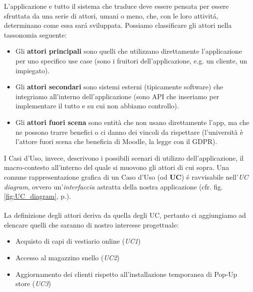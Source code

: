 \documentclass[12pt]{article}
\begin{document}
L'applicazione e tutto il sistema che traduce deve essere pensata per essere sfruttata da una serie di attori, umani o meno, che, con le loro attivit\'a, determinano come essa sar\'a sviluppata. Possiamo classificare gli attori nella tassonomia seguente:
\begin{itemize}
    \item Gli \textbf{attori principali} sono quelli che utilizzano direttamente l’applicazione per uno specifico use case (sono i fruitori dell’applicazione, e.g. un cliente, un impiegato).
    \item Gli \textbf{attori secondari} sono sistemi esterni (tipicamente software) che integriamo all’interno dell’applicazione (sono API che inseriamo per implementare il tutto e su cui non abbiamo controllo).
    \item Gli \textbf{attori fuori scena} sono entità che non usano direttamente l’app, ma che ne possono trarre benefici o ci danno dei vincoli da rispettare (l’università è l’attore fuori scena che beneficia di Moodle, la legge con il GDPR).
\end{itemize}

I Casi d'Uso, invece, descrivono i possibili scenari di utilizzo dell'applicazione, il macro-contesto all'interno del quale si muovono gli attori di cui sopra. Una comune rappresentazione grafica di un Caso d'Uso (od \textbf{UC}) \'e ravvisabile nell'{\em UC diagram}, ovvero un'\textit{interfaccia} astratta della nostra applicazione (cfr. fig. \ref{fig:UC_diagram}, p.\pageref{fig:UC_diagram}).
\\
\\
La definizione degli attori deriva da quella degli UC, pertanto ci aggiungiamo ad elencare quelli che saranno di nostro interesse progettuale:
\begin{itemize}
    \item Acquisto di capi di vestiario online (\textit{UC1})
    \item Accesso al magazzino snello (\textit{UC2})
    \item Aggiornamento dei clienti rispetto all'installazione temporanea di Pop-Up store (\textit{UC3})
\end{itemize}
\end{document}
